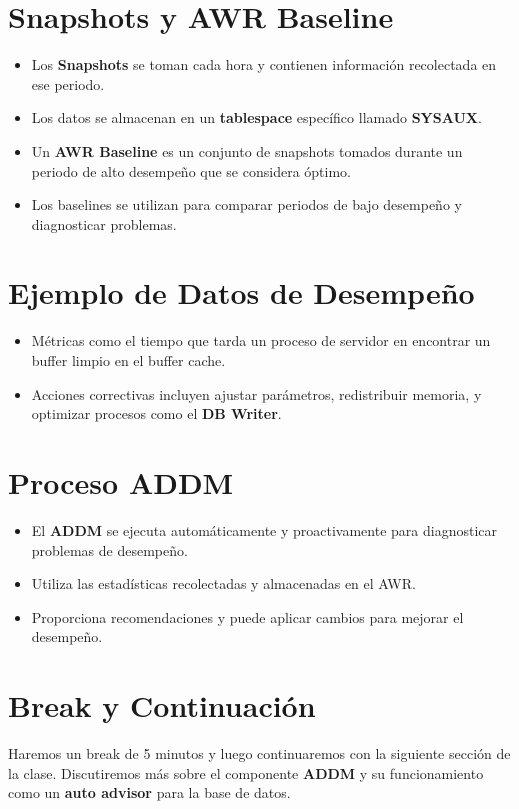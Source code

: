 \documentclass{article}
\begin{document}
\section{Snapshots y AWR Baseline}
\begin{itemize}
    \item Los \textbf{Snapshots} se toman cada hora y contienen información recolectada en ese periodo.
    \item Los datos se almacenan en un \textbf{tablespace} específico llamado \textbf{SYSAUX}.
    \item Un \textbf{AWR Baseline} es un conjunto de snapshots tomados durante un periodo de alto desempeño que se considera óptimo.
    \item Los baselines se utilizan para comparar periodos de bajo desempeño y diagnosticar problemas.
\end{itemize}

\section{Ejemplo de Datos de Desempeño}
\begin{itemize}
    \item Métricas como el tiempo que tarda un proceso de servidor en encontrar un buffer limpio en el buffer cache.
    \item Acciones correctivas incluyen ajustar parámetros, redistribuir memoria, y optimizar procesos como el \textbf{DB Writer}.
\end{itemize}

\section{Proceso ADDM}
\begin{itemize}
    \item El \textbf{ADDM} se ejecuta automáticamente y proactivamente para diagnosticar problemas de desempeño.
    \item Utiliza las estadísticas recolectadas y almacenadas en el AWR.
    \item Proporciona recomendaciones y puede aplicar cambios para mejorar el desempeño.
\end{itemize}

\section{Break y Continuación}
Haremos un break de 5 minutos y luego continuaremos con la siguiente sección de la clase. Discutiremos más sobre el componente \textbf{ADDM} y su funcionamiento como un \textbf{auto advisor} para la base de datos.
\end{document}
